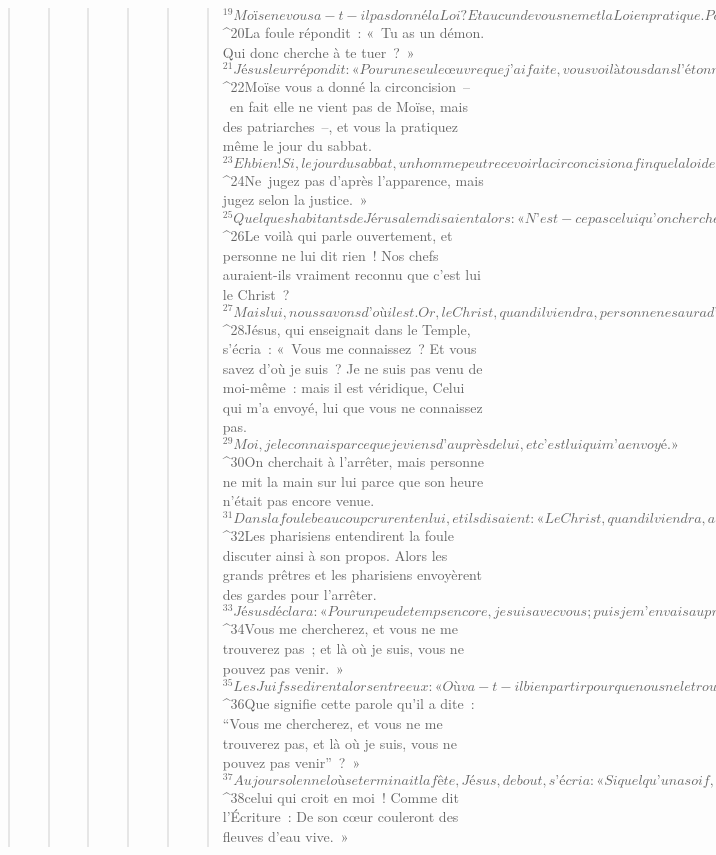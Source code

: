 \begin{verse}
\begin{verse}
\begin{verse}
\begin{verse}
\begin{verse}
\begin{verse}
${}^{19}Moïse ne vous a-t-il pas donné la Loi ? Et aucun de vous ne met la Loi en pratique. Pourquoi cherchez-vous à me tuer ? »
${}^{20}La foule répondit : « Tu as un démon. Qui donc cherche à te tuer ? » 
${}^{21}Jésus leur répondit : « Pour une seule œuvre que j’ai faite, vous voilà tous dans l’étonnement. 
${}^{22}Moïse vous a donné la circoncision – en fait elle ne vient pas de Moïse, mais des patriarches –, et vous la pratiquez même le jour du sabbat. 
${}^{23}Eh bien ! Si, le jour du sabbat, un homme peut recevoir la circoncision afin que la loi de Moïse soit respectée, pourquoi vous emporter contre moi parce que j’ai guéri un homme tout entier le jour du sabbat ? 
${}^{24}Ne jugez pas d’après l’apparence, mais jugez selon la justice. »
${}^{25}Quelques habitants de Jérusalem disaient alors : « N’est-ce pas celui qu’on cherche à tuer ? 
${}^{26}Le voilà qui parle ouvertement, et personne ne lui dit rien ! Nos chefs auraient-ils vraiment reconnu que c’est lui le Christ ? 
${}^{27}Mais lui, nous savons d’où il est. Or, le Christ, quand il viendra, personne ne saura d’où il est. » 
${}^{28}Jésus, qui enseignait dans le Temple, s’écria : « Vous me connaissez ? Et vous savez d’où je suis ? Je ne suis pas venu de moi-même : mais il est véridique, Celui qui m’a envoyé, lui que vous ne connaissez pas. 
${}^{29}Moi, je le connais parce que je viens d’auprès de lui, et c’est lui qui m’a envoyé. »
${}^{30}On cherchait à l’arrêter, mais personne ne mit la main sur lui parce que son heure n’était pas encore venue. 
${}^{31}Dans la foule beaucoup crurent en lui, et ils disaient : « Le Christ, quand il viendra, accomplira-t-il plus de signes que celui-ci n’en a fait ? » 
${}^{32}Les pharisiens entendirent la foule discuter ainsi à son propos. Alors les grands prêtres et les pharisiens envoyèrent des gardes pour l’arrêter. 
${}^{33}Jésus déclara : « Pour un peu de temps encore, je suis avec vous ; puis je m’en vais auprès de Celui qui m’a envoyé. 
${}^{34}Vous me chercherez, et vous ne me trouverez pas ; et là où je suis, vous ne pouvez pas venir. » 
${}^{35}Les Juifs se dirent alors entre eux : « Où va-t-il bien partir pour que nous ne le trouvions pas ? Va-t-il partir chez les nôtres dispersés dans le monde grec, afin d’instruire les Grecs ? 
${}^{36}Que signifie cette parole qu’il a dite : “Vous me chercherez, et vous ne me trouverez pas, et là où je suis, vous ne pouvez pas venir” ? »
${}^{37}Au jour solennel où se terminait la fête, Jésus, debout, s’écria : « Si quelqu’un a soif, qu’il vienne à moi, et qu’il boive, 
${}^{38}celui qui croit en moi ! Comme dit l’Écriture : De son cœur couleront des fleuves d’eau vive. » 

\end{verse}
\end{verse}
\end{verse}
\end{verse}
\end{verse}
\end{verse}
